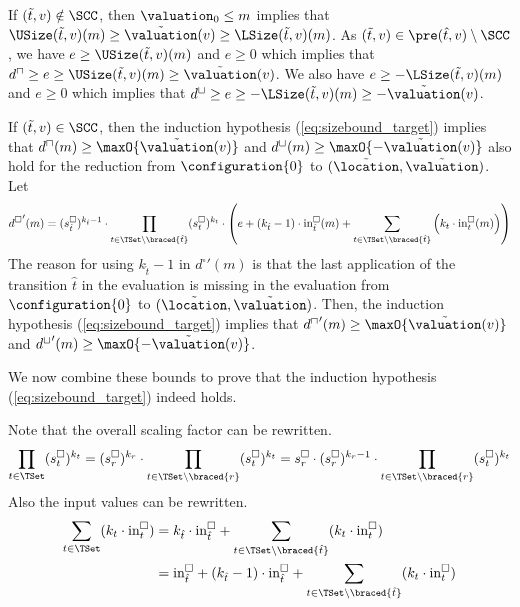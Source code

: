 If $(\tilde{t}, v) \notin \SCC$, then $\valuation_0 \leq m$ implies that $\USize(\tilde{t}, v)(m) \geq \tilde{\valuation}(v) \geq \LSize(\tilde{t}, v)(m)$.
As $(\tilde{t}, v) \in \pre(\hat{t}, v) \setminus \SCC$, we have $e \geq \USize(\tilde{t}, v)(m)$ and $e \geq 0$ which implies that $d^\sqcap \geq e \geq \USize(\tilde{t}, v)(m) \geq \tilde{\valuation}(v)$.
We also have $e \geq -\LSize(\tilde{t}, v)(m)$ and $e \geq 0$ which implies that $d^\sqcup \geq e \geq -\LSize(\tilde{t}, v)(m) \geq -\tilde{\valuation}(v)$.

If $(\tilde{t}, v) \in \SCC$, then the induction hypothesis (\ref{eq:sizebound_target}) implies that $d^\sqcap(m) \geq \maxO{\tilde{\valuation}(v)}$ and $d^\sqcup(m) \geq \maxO{-\tilde{\valuation}(v)}$ also hold for the reduction from $\configuration{0}$ to $(\tilde{\location}, \tilde{\valuation})$.
Let
\begin{equation} \label{eq:induction_consequence}
  {d^\square}'(m) = (s^\square_{\hat{t}})^{k_{\hat{t}} - 1} \cdot \prod_{t \in \TSet \setminus \braced{\hat{t}}} (s^\square_t)^{k_t} \cdot \left( e + \left( k_{\hat{t}} - 1 \right) \cdot \text{in}^\square_{\hat{t}}(m) + \sum_{t \in \TSet \setminus \braced{\hat{t}}} \left( k_t \cdot \text{in}^\square_t(m) \right) \right)
\end{equation}
The reason for using $k_{\hat{t}} - 1$ in ${d^\square}'(m)$ is that the last application of the transition $\hat{t}$ in the evaluation is missing in the evaluation from $\configuration{0}$ to $(\tilde{\location}, \tilde{\valuation})$.
Then, the induction hypothesis (\ref{eq:sizebound_target}) implies that ${d^\sqcap}'(m) \geq \maxO{\tilde{\valuation}(v)}$ and ${d^\sqcup}'(m) \geq \maxO{-\tilde{\valuation}(v)}$.

We now combine these bounds to prove that the induction hypothesis (\ref{eq:sizebound_target}) indeed holds.

Note that the overall scaling factor can be rewritten.
\begin{equation} \label{eq:scaling_factor_reduction}
  \prod_{t \in \TSet} (s^\square_t)^{k_t} = (s^\square_r)^{k_r} \cdot \prod_{t \in \TSet \setminus \braced{r}} (s^\square_t)^{k_t} = s^\square_r \cdot (s^\square_r)^{k_r - 1} \cdot \prod_{t \in \TSet \setminus \braced{r}} (s^\square_t)^{k_t}
\end{equation}
Also the input values can be rewritten.
\begin{equation} \label{eq:input_reduction}
  \begin{split}
  \sum_{t \in \TSet} (k_t \cdot \text{in}^\square_t)
  & = k_{\hat{t}} \cdot \text{in}^\square_{\hat{t}} + \sum_{t \in \TSet \setminus \braced{\hat{t}}} (k_t \cdot \text{in}^\square_t) \\
  & = \text{in}^\square_{\hat{t}}
    + (k_{\hat{t}} - 1) \cdot \text{in}^\square_{\hat{t}}
    + \sum_{t \in \TSet \setminus \braced{\hat{t}}} (k_t \cdot \text{in}^\square_t)
  \end{split}
\end{equation}

